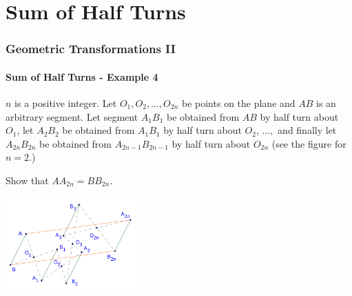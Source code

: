 \documentclass[8pt,xcolor=table,dvipsnames]{beamer}
\begin{document}
\section{Sum of Half Turns}

\begin{frame}[t]
    \frametitle{Geometric Transformations II}
    \framesubtitle{Sum of Half Turns - Example 4}
    \begin{example}
        $n$ is a positive integer. Let $O_1, O_2, \ldots, O_{2n}$ be points on the plane and $AB$ is an arbitrary segment.
        Let segment $A_1B_1$ be obtained from $AB$ by half turn about $O_1$, let $A_2B_2$ be obtained from $A_1B_1$ by half turn about $O_2$, $\ldots,$
        and finally let $A_{2n}B_{2n}$ be obtained from $A_{2n-1}B_{2n-1}$ by half turn about $O_{2n}$ (see the figure for $n=2.$)

        \bigbreak
        Show that $AA_{2n} = BB_{2n}.$
    \end{example}

    \begin{center}
        \includegraphics[width=5cm]{./svg/pdf/translation-1.pdf}
    \end{center}
\end{frame}
\end{document}
